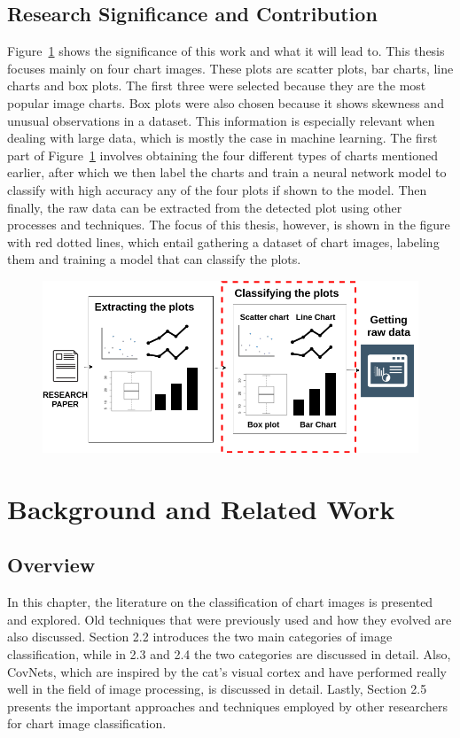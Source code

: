 \documentclass[12pt, a4paper,oneside]{report}
\begin{document}
\section{Research Significance and Contribution}
Figure~\ref{fig:vis} shows the significance of this work and what it will lead to. This thesis focuses mainly on four chart images. These plots are scatter plots, bar charts, line charts and box plots. The first three were selected because they are the most popular image charts. Box plots were also chosen because it shows skewness and unusual observations in a dataset. This information is especially relevant when dealing with large data, which is mostly the case in machine learning. The first part of Figure~\ref{fig:vis} involves obtaining the four different types of charts mentioned earlier, after which we then label the charts and train a neural network model to classify with high accuracy any of the four plots if shown to the model. Then finally, the raw data can be extracted from the detected plot using other processes and techniques. The focus of this thesis, however, is shown in the figure with red dotted lines, which entail gathering a dataset of chart images, labeling them and training a model that can classify the plots. 

\begin{figure}[!htb]
\includegraphics [scale=0.48] {vision}
\label{fig:vis}
\end{figure}


\chapter{Background and Related Work}
\section{Overview}
In this chapter, the literature on the classification of chart images is presented and explored. Old techniques that were previously used and how they evolved are also discussed. Section 2.2 introduces the two main categories of image classification, while in 2.3 and 2.4 the two categories are discussed in detail. Also, CovNets, which are inspired by the cat’s visual cortex and have performed really well in the field of image processing, is discussed in detail. Lastly, Section 2.5 presents the important approaches and techniques employed by other researchers for chart image classification.
\end{document}
